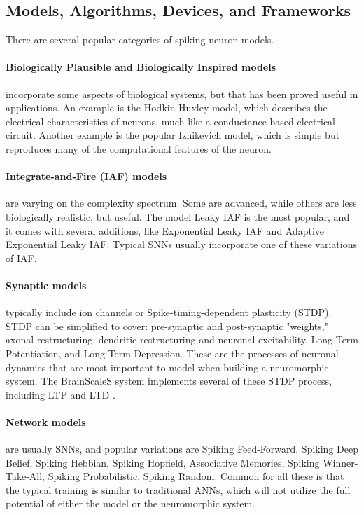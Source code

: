 \subsection{Models, Algorithms, Devices, and Frameworks}
There are several popular categories of spiking neuron models.

\paragraph{Biologically Plausible and Biologically Inspired models} incorporate some aspects of biological systems, but that has been proved useful in applications.
An example is the Hodkin-Huxley model, which describes the electrical characteristics of neurons, much like a conductance-based electrical circuit.
Another example is the popular Izhikevich model, which is simple but reproduces many of the computational features of the neuron.
\cite{schuman_survey_2017}

\paragraph{Integrate-and-Fire (IAF) models} are varying on the complexity spectrum. Some are advanced, while others are less biologically realistic, but useful.
The model Leaky IAF is the most popular, and it comes with several additions, like Exponential Leaky IAF and Adaptive Exponential Leaky IAF. Typical SNNs usually incorporate one of these variations of IAF.
\cite{schuman_survey_2017}

\paragraph{Synaptic models} typically include ion channels or Spike-timing-dependent plasticity (STDP).
STDP can be simplified to cover: pre-synaptic and post-synaptic "weights," axonal restructuring, dendritic restructuring and neuronal excitability, Long-Term Potentiation, and Long-Term Depression.
These are the processes of neuronal dynamics that are most important to model when building a neuromorphic system.
The BrainScaleS system implements several of these STDP process, including LTP and LTD \cite{meier_mixed-signal_2015}\cite{schemmel_implementing_2006}.
\cite{schuman_survey_2017}

\paragraph{Network models} are usually SNNs, and popular variations are Spiking Feed-Forward, Spiking Deep Belief, Spiking Hebbian, Spiking Hopfield, Associative Memories, Spiking Winner-Take-All, Spiking Probabilistic, Spiking Random. Common for all these is that the typical training is similar to traditional ANNs, which will not utilize the full potential of either the model or the neuromorphic system.
\cite{schuman_survey_2017}

